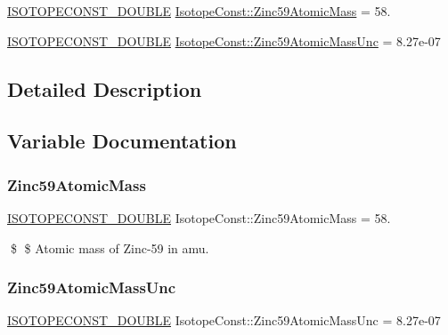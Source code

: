 \begin{DoxyCompactItemize}
\item 
\mbox{\hyperlink{group___isotope_const-_macros_ga8f45a7272ce02c0b4c65c44636ed719a}{I\+S\+O\+T\+O\+P\+E\+C\+O\+N\+S\+T\+\_\+\+D\+O\+U\+B\+LE}} \mbox{\hyperlink{group___isotope_const-_zinc-_zn59_gac0650f1c24d0fce6daaa2229801cf65d}{Isotope\+Const\+::\+Zinc59\+Atomic\+Mass}} = 58.
\item 
\mbox{\hyperlink{group___isotope_const-_macros_ga8f45a7272ce02c0b4c65c44636ed719a}{I\+S\+O\+T\+O\+P\+E\+C\+O\+N\+S\+T\+\_\+\+D\+O\+U\+B\+LE}} \mbox{\hyperlink{group___isotope_const-_zinc-_zn59_ga2bfb97551d5e75a38110db3e94f91d2d}{Isotope\+Const\+::\+Zinc59\+Atomic\+Mass\+Unc}} = 8.\+27e-\/07
\end{DoxyCompactItemize}


\subsection{Detailed Description}


\subsection{Variable Documentation}
\mbox{\label{group___isotope_const-_zinc-_zn59_gac0650f1c24d0fce6daaa2229801cf65d}} 
\subsubsection{\texorpdfstring{Zinc59\+Atomic\+Mass}{Zinc59AtomicMass}}
{\footnotesize\ttfamily \mbox{\hyperlink{group___isotope_const-_macros_ga8f45a7272ce02c0b4c65c44636ed719a}{I\+S\+O\+T\+O\+P\+E\+C\+O\+N\+S\+T\+\_\+\+D\+O\+U\+B\+LE}} Isotope\+Const\+::\+Zinc59\+Atomic\+Mass = 58.}

\$ \$ Atomic mass of Zinc-\/59 in amu. \mbox{\label{group___isotope_const-_zinc-_zn59_ga2bfb97551d5e75a38110db3e94f91d2d}} 
\subsubsection{\texorpdfstring{Zinc59\+Atomic\+Mass\+Unc}{Zinc59AtomicMassUnc}}
{\footnotesize\ttfamily \mbox{\hyperlink{group___isotope_const-_macros_ga8f45a7272ce02c0b4c65c44636ed719a}{I\+S\+O\+T\+O\+P\+E\+C\+O\+N\+S\+T\+\_\+\+D\+O\+U\+B\+LE}} Isotope\+Const\+::\+Zinc59\+Atomic\+Mass\+Unc = 8.\+27e-\/07}

